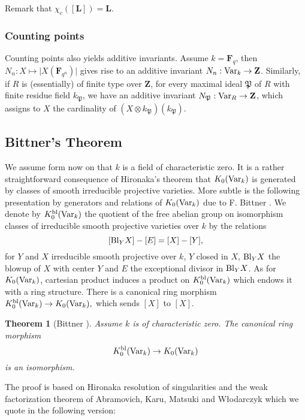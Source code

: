\documentclass[english,12pt]{amsart}
\def\Var{{\rm Var}}
\let\got\mathfrak
\def\gP{{\got P}}
\def\FF{{\mathbf F}}
\def\LL{{\mathbf L}}
\def\ZZ{{\mathbf Z}}
\newtheorem{theorem}[subsubsection]{Theorem}
\theoremstyle{definition}
\theoremstyle{remark}
\theoremstyle{plain}
\numberwithin{equation}{subsection}
\let\got\mathfrak
\def\FF{{\mathbf F}}
\def\LL{{\mathbf L}}
\def\ZZ{{\mathbf Z}}
\begin{document}
Remark that $\chi_{c} ([\LL]) = \LL$.



\subsubsection{Counting points} Counting points also
yields additive invariants.
Assume $k = \FF_q$, then
$N_n : X \mapsto \vert X (\FF_{q^n}) \vert$ gives rise to an additive invariant
$N_n : {\rm Var}_k \rightarrow \ZZ$.
Similarly, if $R$ is (essentially) of finite type over $\ZZ$, for every maximal
ideal $\gP$ of $R$ with finite residue field $k_{\gP}$, we have 
an additive invariant
$N_{\gP} : {\rm Var}_R \rightarrow \ZZ$, which assigns to $X$
the cardinality of $(X \otimes k_{\gP})(k_{\gP})$.




\subsection{Bittner's Theorem}\label{bitt}We assume form now on that $k$ 
is a field of characteristic zero.
It is a rather straightforward consequence of Hironaka's theorem
that $K_0 (\Var_k)$ is generated by classes of smooth irreducible
projective  varieties. More subtle is the following
presentation by generators and relations of 
$K_0 (\Var_k)$
due to F. Bittner \cite{Bittner}.
We denote
by  $K_0^{\rm bl} (\Var_k)$
the quotient of the free abelian group
on isomorphism classes of irreducible smooth projective
varieties over $k$
by the relations 
$$
[{\rm Bl}_Y X] - [E] =  [X] - [Y],
$$
for $Y$ and $X$ irreducible
smooth projective over $k$,
$Y$ closed in $X$, ${\rm Bl}_Y X$ the blowup of $X$ with center
$Y$ and $E$ the exceptional divisor in ${\rm Bl}_Y X$.
As for $K_0 (\Var_k)$,
cartesian product induces a product on 
$K_0^{\rm bl} (\Var_k)$ which endows it with a ring structure.
There is a canonical ring morphism
$
K_0^{\rm bl} (\Var_k) \rightarrow K_0 (\Var_k),
$
which sends $[X]$ to $[X]$.


\begin{theorem}[Bittner \cite{Bittner}]\label{bi}Assume $k$
is of characteristic zero. The
canonical ring morphism
$$
K_0^{\rm bl} (\Var_k) \rightarrow K_0 (\Var_k)
$$
is an isomorphism.
\end{theorem}


The proof is based on Hironaka resolution of singularities
and the weak factorization theorem
of Abramovich, Karu, Matsuki and
W{\l}odarczyk \cite{wf} which we quote in  the following version:
\end{document}
